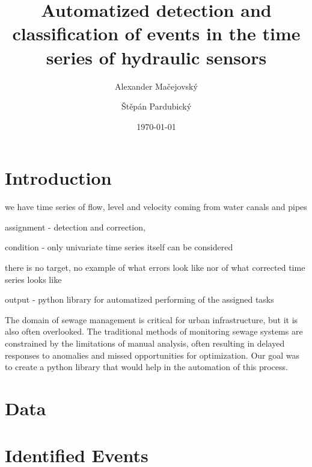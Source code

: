 \documentclass[12pt,a4paper]{article}
\title{Automatized detection and classification of events in the time series of hydraulic sensors}
\author{Alexander Ma\v{c}ejovsk\'{y} \and \v{S}t\v{e}p\'{a}n Pardubick\'{y}}
\date{\today}
\begin{document}

\maketitle %

\thispagestyle{empty} %

\clearpage %

\tableofcontents  

\newpage



\section{Introduction}
we have time  series of flow, level and velocity coming from water canals and pipes

assignment - detection and correction, 

condition - only univariate time series itself can be considered

there is no target, no example of what errors look like nor of what corrected time series looks like

output - python library for automatized performing of the assigned tasks

The domain of sewage management is critical for urban infrastructure, but it is also often overlooked.
The traditional methods of monitoring sewage systems are constrained by the limitations of manual analysis, often resulting in delayed responses to anomalies and missed opportunities for optimization.
Our goal was to create a python library that would help in the automation of this process.



\section{Data}




\section{Identified Events}
\end{document}
